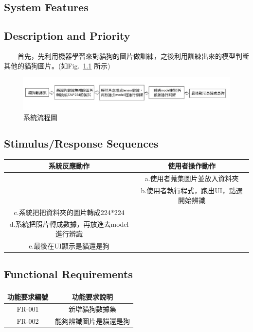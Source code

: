 \documentclass{scrreprt}
\begin{document}
\begin{CJK*}{UTF8}{bsmi}
\chapter{System Features}

\section{Description and Priority}
　　首先，先利用機器學習來對貓狗的圖片做訓練，之後利用訓練出來的模型判斷其他的貓狗圖片。(如Fig. \,\ref{fig:4.1} 所示)\\
\begin{figure}[h]
\begin{center}
\includegraphics[width=18cm]{process.jpg} 
\end{center} 
\label{fig:4.1} 
\caption{系統流程圖} 
\end{figure}
\section{Stimulus/Response Sequences}\begin{center}
    \begin{tabular}{|c|c|}
        \hline
	    系統反應動作 & 使用者操作動作 \\
        \hline
	    &a.使用者蒐集圖片並放入資料夾 \\ 
        \hline
	    &b.使用者執行程式，跑出UI，點選開始辨識 \\
        \hline
	   c.系統把把資料夾的圖片轉成224*224 & \\
        \hline
	  d.系統把照片轉成數據，再放進去model進行辨識 & \\
        \hline
	   e.最後在UI顯示是貓還是狗 & \\
        \hline
    \end{tabular}
\end{center}




\section{Functional Requirements}
\begin{center}
    \begin{tabular}{|c|c|}
        \hline
	    功能要求編號 & 功能要求說明 \\
        \hline
	    FR-001 & 新增貓狗數據集\\ 
        \hline
	    FR-002 & 能夠辨識圖片是貓還是狗\\
        \hline
    \end{tabular}
\end{center}




\end{CJK*}
\end{document}
